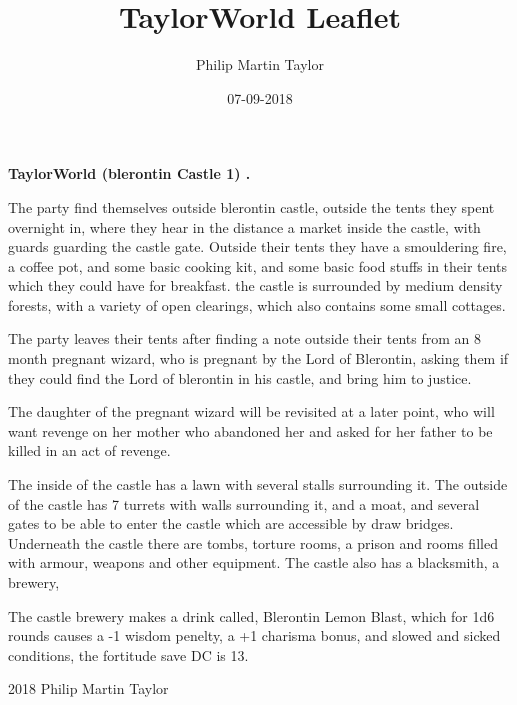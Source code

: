\documentclass[12pt,a4paper]{book}
\date{07-09-2018}
\author{Philip Martin Taylor}
\title{TaylorWorld Leaflet}
\begin{document}
\begin{center}
\textbf{TaylorWorld (blerontin Castle 1) \texttrademark.}
\end{center}
\begin{flushleft}
  The party find themselves outside blerontin castle, outside the tents they spent overnight in, where they hear in the distance a market inside the castle, with guards guarding the castle gate. Outside their tents they have a smouldering fire, a coffee pot, and some basic cooking kit, and some basic food stuffs in their tents which they could have for breakfast. the castle is surrounded by medium density forests, with a variety of open clearings, which also contains some small cottages.
\end{flushleft}
\begin{flushleft}
  The party leaves their tents after finding a note outside their tents from an 8 month pregnant wizard, who is pregnant by the Lord of Blerontin, asking them if they could find the Lord of blerontin in his castle, and bring him to justice. 
\end{flushleft}
\begin{flushleft}
  The daughter of the pregnant wizard will be revisited at a later point, who will want revenge on her mother who abandoned her and asked for her father to be killed in an act of revenge.
\end{flushleft}
\begin{flushleft}
  The inside of the castle has a lawn with several stalls surrounding it. The outside of the castle has 7 turrets with walls surrounding it, and a moat, and several gates to be able to enter the castle which are accessible by draw bridges. Underneath the castle there are tombs, torture rooms, a prison and rooms filled with armour, weapons and other equipment. The castle also has a blacksmith, a brewery, 
\end{flushleft}
\begin{flushleft}
  The castle brewery makes a drink called, Blerontin Lemon Blast, which for 1d6 rounds causes a -1 wisdom penelty, a +1 charisma bonus, and slowed and sicked conditions, the fortitude save DC is 13.
\end{flushleft}
\begin{center}
  \textcopyright{} 2018 Philip Martin Taylor
\end{center}
\end{document}
